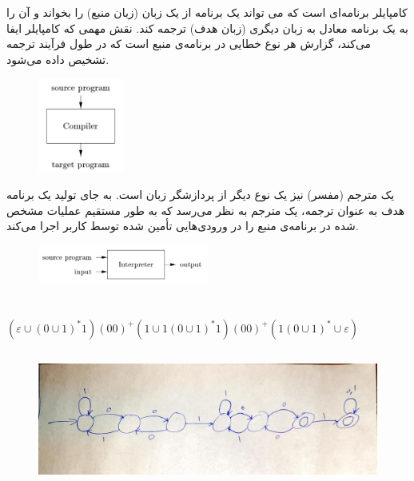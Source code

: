 \documentclass{article}
\begin{document}
\section{}%

کامپایلر برنامه‌ای است که می تواند یک برنامه از یک زبان (زبان منبع) را بخواند و آن را به یک برنامه معادل به زبان دیگری (زبان هدف) ترجمه کند. نقش مهمی که کامپایلر ایفا می‌کند، گزارش هر نوع خطایی در برنامه‌ی منبع است که در طول فرآیند ترجمه تشخیص داده می‌شود.
\begin{figure}[H]
    \centering
    \includegraphics[width=0.25\textwidth]{figures/2a.png}
    \caption
	{}
    \label{fig:fig1}
\end{figure}
یک مترجم (مفسر) نیز یک نوع دیگر از پردازشگر زبان است. به جای تولید یک برنامه هدف به عنوان ترجمه، یک مترجم به نظر می‌رسد که به طور مستقیم عملیات مشخص شده در برنامه‌ی منبع را در ورودی‌هایی تأمین شده توسط کاربر اجرا می‌کند.
\begin{figure}[H]
    \centering
    \includegraphics[width=0.5\textwidth]{figures/2b.png}
    \caption
	{}
    \label{fig:fig1}
\end{figure}

\section{}%
\subsection{}
\begin{latin}
$
\left( \varepsilon \cup \left( 0 \cup 1 \right) ^ {*} 1 \right) \left( 00 \right) ^ {+} \left( 1 \cup 1\left( 0 \cup 1 \right) ^ {*}1 \right) \left( 00 \right) ^ {+} \left( 1 \left( 0 \cup 1 \right) ^ {*} \cup \varepsilon \right)
$
\end{latin}
\subsection{}
\begin{figure}[H]
    \centering
    \includegraphics[width=1\textwidth]{figures/3b.jpg}
    \caption
	{}
    \label{fig:fig1}
\end{figure}
\end{document}
